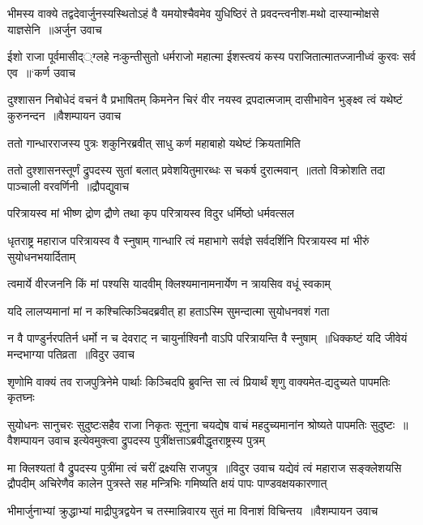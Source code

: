 \twolineshloka
{भीमस्य वाक्ये तद्वदेवार्जुनस्यस्थितोऽहं वै यमयोश्चैवमेव}
{युधिष्ठिरं ते प्रवदन्त्वनीश-मथो दास्यान्मोक्षसे याज्ञसेनि ॥अर्जुन उवाच}


\twolineshloka
{ईशो राजा पूर्वमासीद््ग्लहे नःकुन्तीसुतो धर्मराजो महात्मा}
{ईशस्त्वयं कस्य पराजितात्मातज्जानीध्वं कुरवः सर्व एव ॥`कर्ण उवाच}


\threelineshloka
{दुश्शासन निबोधेदं वचनं वै प्रभाषितम्}
{किमनेन चिरं वीर नयस्व द्रपदात्मजाम्}
{दासीभावेन भुङ्क्ष्व त्वं यथेष्टं कुरुनन्दन ॥वैशम्पायन उवाच}


\twolineshloka
{ततो गान्धारराजस्य पुत्रः शकुनिरब्रवीत्}
{साधु कर्ण महाबाहो यथेष्टं क्रियतामिति}


\threelineshloka
{ततो दुश्शासनस्तूर्णं द्रुपदस्य सुतां बलात्}
{प्रवेशयितुमारब्धः स चकर्ष दुरात्मवान् ॥ततो विक्रोशति तदा पाञ्चाली वरवर्णिनी ॥द्रौपद्युवाच}
{}


\twolineshloka
{परित्रायस्व मां भीष्ण द्रोण द्रौणे तथा कृप}
{परित्रायस्व विदुर धर्मिष्ठो धर्मवत्सल}


\threelineshloka
{धृतराष्ट्र महाराज परित्रायस्व वै स्नुषाम्}
{गान्धारि त्वं महाभागे सर्वज्ञे सर्वदर्शिनि}
{पिरत्रायस्व मां भीरुं सुयोधनभयार्दिताम्}


\twolineshloka
{त्वमार्ये वीरजननि किं मां पश्यसि यादवीम्}
{क्लिश्यमानामनार्येण न त्रायसिव वधूं स्वकाम्}


\twolineshloka
{यदि लालप्यमानां मां न कश्चित्किञ्चिदब्रवीत्}
{हा हताऽस्मि सुमन्दात्मा सुयोधनवशं गता}


\twolineshloka
{न वै पाण्डुर्नरपतिर्न धर्मो न च देवराट्}
{न चायुर्नाश्विनौ वाऽपि परित्रायन्ति वै स्नुषाम् ॥धिक्कष्टं यदि जीवेयं मन्दभाग्या पतिव्रता ॥विदुर उवाच}


\twolineshloka
{शृणोमि वाक्यं तव राजपुत्रिनेमे पार्थाः किञ्चिदपि ब्रुवन्ति}
{सा त्वं प्रियार्थं शृणु वाक्यमेत-द्यदुच्यते पापमतिः कृतघ्नः}


सुयोधनः सानुचरः सुदुष्टःसहैव राजा निकृतः सूनुना चयद्येष वाचं महदुच्यमानांन श्रोष्यते पापमतिः सुदुष्टः ॥वैशम्पायन उवाच
\twolineshloka
{इत्येवमुक्त्वा द्रुपदस्य पुत्रींक्षत्ताऽब्रवीद्धृतराष्ट्रस्य पुत्रम्}
{}


मा क्लिश्यतां वै द्रुपदस्य पुत्रींमा त्वं चरीं द्रक्ष्यसि राजपुत्र ॥विदुर उवाच
\threelineshloka
{यद्येवं त्वं महाराज सङ्क्लेशयसि द्रौपदीम्}
{अचिरेणैव कालेन पुत्रस्ते सह मन्त्रिभिः}
{गमिष्यति क्षयं पापः पाण्डवक्षयकारणात्}


\twolineshloka
{भीमार्जुनाभ्यां क्रुद्धाभ्यां माद्रीपुत्रद्वयेन च}
{तस्मान्निवारय सुतं मा विनाशं विचिन्तय ॥वैशम्पायन उवाच}


